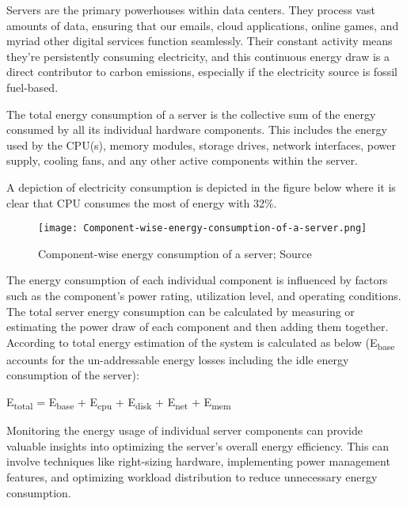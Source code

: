 \documentclass[
  a4paper,  %
  twoside,  %
  bibliography=totoc,
  headsepline,
  cleardoublepage=empty,
  parskip=half,
  draft=false
]{scrbook}
\begin{document}
Servers are the primary powerhouses within data centers. They process vast amounts of data, ensuring  that  our  emails,  cloud  applications,  online games,  and  myriad  other  digital  services function seamlessly\cite{techtargetMajorServer}. Their constant  activity means they're persistently consuming electricity\cite{energyinnovationMuchEnergy}, and this continuous energy draw is a direct contributor to carbon emissions, especially if the electricity source is fossil fuel-based.

The total energy consumption of a server is the collective sum of the energy consumed by all its individual hardware components. This includes the energy used by the CPU(s), memory modules, storage drives, network interfaces, power supply, cooling fans, and any other active components within the server\cite{ahmed2021review}. 


A depiction of electricity consumption is depicted in the figure below where it is clear that CPU consumes the most of energy with 32\%.

\begin{figure}
	\centering
	\texttt{[image: Component-wise-energy-consumption-of-a-server.png]}
	\caption{Component-wise energy consumption of a server; Source\cite{ahmed2021review}}
\end{figure}

The energy consumption of each individual component is influenced by factors such as the component's power rating, utilization level, and operating conditions. The total server energy consumption can be calculated by measuring or estimating the power draw of each component and then adding them together. According to \cite{chatzipapas2015challenge} total energy estimation of the system is calculated as below (E\textsubscript{base} accounts for the un-addressable energy losses including the idle energy consumption of the server):

\begin{center}
	E\textsubscript{total} = E\textsubscript{base} + E\textsubscript{cpu} + E\textsubscript{disk} + E\textsubscript{net} + E\textsubscript{mem}
\end{center}

Monitoring the energy usage of individual server components can provide valuable insights into optimizing the server's overall energy efficiency. This can involve techniques like right-sizing hardware, implementing power management features, and optimizing workload distribution to reduce unnecessary energy consumption\cite{LIN201847}.
\end{document}
